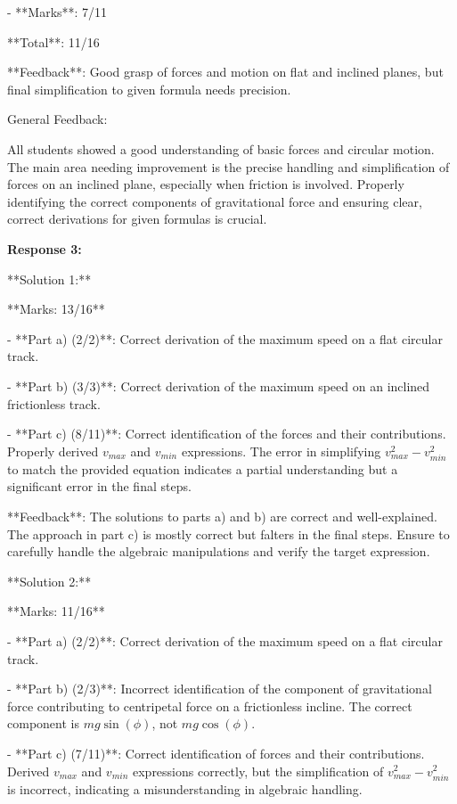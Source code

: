 \documentclass[a4paper,11pt]{article}
\begin{document}
- **Marks**: 7/11

**Total**: 11/16

**Feedback**: Good grasp of forces and motion on flat and inclined planes, but final simplification to given formula needs precision.

General Feedback:

All students showed a good understanding of basic forces and circular motion. The main area needing improvement is the precise handling and simplification of forces on an inclined plane, especially when friction is involved. Properly identifying the correct components of gravitational force and ensuring clear, correct derivations for given formulas is crucial.

\bigskip
\textbf{Response 3:}

**Solution 1:**

**Marks: 13/16**

- **Part a) (2/2)**: Correct derivation of the maximum speed on a flat circular track. 

- **Part b) (3/3)**: Correct derivation of the maximum speed on an inclined frictionless track.

- **Part c) (8/11)**: Correct identification of the forces and their contributions. Properly derived \(v_{max}\) and \(v_{min}\) expressions. The error in simplifying \(v_{max}^2 - v_{min}^2\) to match the provided equation indicates a partial understanding but a significant error in the final steps.

**Feedback**: The solutions to parts a) and b) are correct and well-explained. The approach in part c) is mostly correct but falters in the final steps. Ensure to carefully handle the algebraic manipulations and verify the target expression.

**Solution 2:**

**Marks: 11/16**

- **Part a) (2/2)**: Correct derivation of the maximum speed on a flat circular track.

- **Part b) (2/3)**: Incorrect identification of the component of gravitational force contributing to centripetal force on a frictionless incline. The correct component is \(mg \sin(\phi)\), not \(mg \cos(\phi)\).

- **Part c) (7/11)**: Correct identification of forces and their contributions. Derived \(v_{max}\) and \(v_{min}\) expressions correctly, but the simplification of \(v_{max}^2 - v_{min}^2\) is incorrect, indicating a misunderstanding in algebraic handling.
\end{document}
